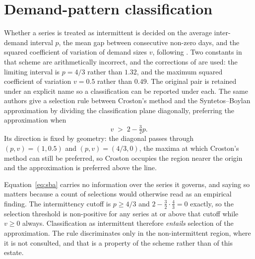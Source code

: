 \section{Demand-pattern classification}
\label{sec:intermittency}

Whether a series is treated as intermittent is decided on the average inter-demand interval $p$,
the mean gap between consecutive non-zero days, and the squared coefficient of variation of
demand sizes $v$, following \citet{syntetos_categorization_2005}. Two constants in that scheme
are arithmetically incorrect, and the corrections of \citet{kostenko_note_2006} are used: the
limiting interval is $p = 4/3$ rather than $1.32$, and the maximum squared coefficient of
variation $v = 0.5$ rather than $0.49$. The original pair is retained under an explicit name so
a classification can be reported under each. The same authors give a selection rule between
Croston's method and the Syntetos–Boylan approximation by dividing the classification plane
diagonally, preferring the approximation when
\begin{equation}
v \;>\; 2 - \tfrac{3}{2}p .
\label{eq:sba}
\end{equation}
Its direction is fixed by geometry: the diagonal passes through $(p,v) = (1, 0.5)$ and
$(p,v) = (4/3, 0)$, the maxima at which Croston's method can still be preferred, so Croston
occupies the region nearer the origin and the approximation is preferred above the line.

Equation~\ref{eq:sba} carries no information over the series it governs, and saying so matters
because a count of selections would otherwise read as an empirical finding. The intermittency
cutoff is $p \geq 4/3$ and $2 - \tfrac{3}{2}\cdot\tfrac{4}{3} = 0$ exactly, so the selection
threshold is non-positive for any series at or above that cutoff while $v \geq 0$ always.
Classification as intermittent therefore \emph{entails} selection of the approximation. The rule
discriminates only in the non-intermittent region, where it is not consulted, and that is a
property of the scheme rather than of this estate.

